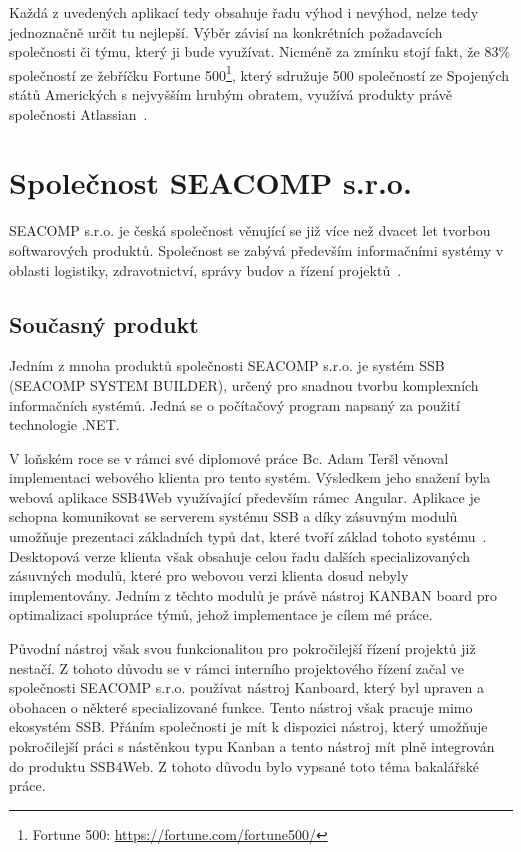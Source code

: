 Každá z uvedených aplikací tedy obsahuje řadu výhod i nevýhod, nelze tedy jednoznačně určit tu nejlepší. Výběr závisí na konkrétních požadavcích společnosti či týmu, který ji bude využívat. Nicméně za zmínku stojí fakt, že 83\% společností ze žebříčku Fortune 500\footnote{Fortune 500: \url{https://fortune.com/fortune500/}}, který sdružuje 500 společností ze Spojených států Amerických s nejvyšším hrubým obratem, využívá produkty právě společnosti Atlassian~\cite{bib:atlassian-customers}.



\section{Společnost SEACOMP s.r.o.}
SEACOMP s.r.o. je česká společnost věnující se již více než dvacet let tvorbou softwarových produktů. Společnost se zabývá především informačními systémy v oblasti logistiky, zdravotnictví, správy budov a řízení projektů~\cite{bib:seacomp-portfolio}.


\subsection{Současný produkt}
Jedním z mnoha produktů společnosti SEACOMP s.r.o. je systém SSB (SEACOMP SYSTEM BUILDER), určený pro snadnou tvorbu komplexních informačních systémů. Jedná se o počítačový program napsaný za použití technologie .NET.

V loňském roce se v rámci své diplomové práce Bc. Adam Teršl věnoval implementaci webového klienta pro tento systém. Výsledkem jeho snažení byla webová aplikace SSB4Web využívající především rámec Angular. Aplikace je schopna komunikovat se serverem systému SSB a díky zásuvným modulů umožňuje prezentaci základních typů dat, které tvoří základ tohoto systému~\cite{bib:tersl}. Desktopová verze klienta však obsahuje celou řadu dalších specializovaných zásuvných modulů, které pro webovou verzi klienta dosud nebyly implementovány. Jedním z těchto modulů je právě nástroj KANBAN board pro optimalizaci spolupráce týmů, jehož implementace je cílem mé práce. 

Původní nástroj však svou funkcionalitou pro pokročilejší řízení projektů již nestačí. Z tohoto důvodu se v rámci interního projektového řízení začal ve společnosti SEACOMP s.r.o. používat nástroj Kanboard, který byl upraven a obohacen o některé specializované funkce. Tento nástroj však pracuje mimo ekosystém SSB. Přáním společnosti je mít k dispozici nástroj, který umožňuje pokročilejší práci s nástěnkou typu Kanban a tento nástroj mít plně integrován do produktu SSB4Web. Z tohoto důvodu bylo vypsané toto téma bakalářské práce.


